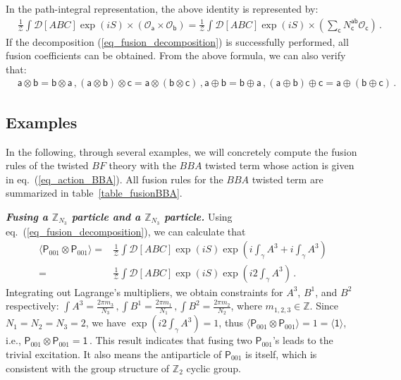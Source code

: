 \documentclass[11pt,nofootinbib,preprint]{revtex4-1}
\begin{document}
In the path-integral representation, the above identity is represented by:   
\begin{align}
	 &\frac{1}{\mathcal{Z}}\int\mathcal{D} \left[ ABC\right] \exp \left( iS \right) \times \left( \mathcal{O} _{\mathsf{a}}\times \mathcal{O} _{\mathsf{b}} \right) =\frac{1}{\mathcal{Z}}\int \mathcal{D} \left[ ABC\right] \exp \left( iS \right) \times \left( \sum_\mathsf{c}{N_{\mathsf{c}}^{\mathsf{a}\mathsf{b}}}\mathcal{O} _{\mathsf{c}} \right)  \,.
	 	\label{eq_fusion_decomposition}
\end{align}
If the  decomposition (\ref{eq_fusion_decomposition}) is successfully performed,  all fusion coefficients can be obtained.  From the above formula, we can also verify that: 
\begin{align}
	&\mathsf{a}\otimes \mathsf{b}=\mathsf{b}\otimes \mathsf{a}\,, \left(\mathsf{a}\otimes \mathsf{b}\right)\otimes \mathsf{c}=\mathsf{a}\otimes\left(\mathsf{b}\otimes \mathsf{c}\right)\,,\mathsf{a}\oplus \mathsf{b}=\mathsf{b}\oplus \mathsf{a}\,,\left(\mathsf{a}\oplus \mathsf{b}\right)\oplus \mathsf{c}=\mathsf{a}\oplus\left(\mathsf{b}\oplus \mathsf{c}\right)\,.
	\label{eq_fusion_algebra_rule}
\end{align} 
\subsection{Examples\label{ss31}}
In the following, through     several examples, we will  concretely compute the fusion rules of the twisted $BF$ theory with the $BBA$ twisted term whose action is given in eq.~(\ref{eq_action_BBA}).  All fusion rules for the $BBA$ twisted term are summarized   in table~\ref{table_fusionBBA}.




\textbf{\textit{Fusing a $\mathbb{Z} _{N_3}$ particle and a $\mathbb{Z} _{N_3}$ particle.}}
Using eq.~(\ref{eq_fusion_decomposition}), we can calculate that
\begin{align}
	\langle \mathsf{P}_{001}\otimes \mathsf{P}_{001} \rangle 
	=&\frac{1}{\mathcal{Z}}\int{\mathcal{D} \left[ ABC   \right] \exp \left( iS \right) \exp \left( i\int_{\gamma}{A^3}+i\int_{\gamma}{A^3} \right) } \nonumber
	\\
	=&\frac{1}{\mathcal{Z}}\int{\mathcal{D} \left[ ABC   \right]  \exp \left( iS \right) \exp \left( i2\int_{\gamma}{A^3} \right) }  \,.
\end{align}
Integrating out Lagrange's multipliers, we obtain constraints for $A^3$, $B^1$, and $B^2$ respectively:
$\int{A^3}=\frac{2\pi m_3}{N_3}  \,,
	\int{B^1}=\frac{2\pi m_1}{N_1}  \,,
	\int{B^2}=\frac{2\pi m_2}{N_2} $, 
where $m_{1,2,3}\in\mathbb{Z}$. Since $N_1=N_2=N_3=2$, we have $\exp \left( i2\int_{\gamma}{A^3} \right) =1$, thus
 $	\langle\mathsf{P}_{001}\otimes \mathsf{P}_{001} \rangle =1=\langle\mathsf{1} \rangle$,
i.e., 
$	\mathsf{P}_{001}\otimes \mathsf{P}_{001}=\mathsf{1}\,$.  This result indicates that fusing two $\mathsf{P}_{001}$'s leads to the trivial excitation. It also   means the antiparticle of $\mathsf{P}_{001}$ is itself, which is   consistent with the group structure of $\mathbb{Z}_2$ cyclic group.
\end{document}
